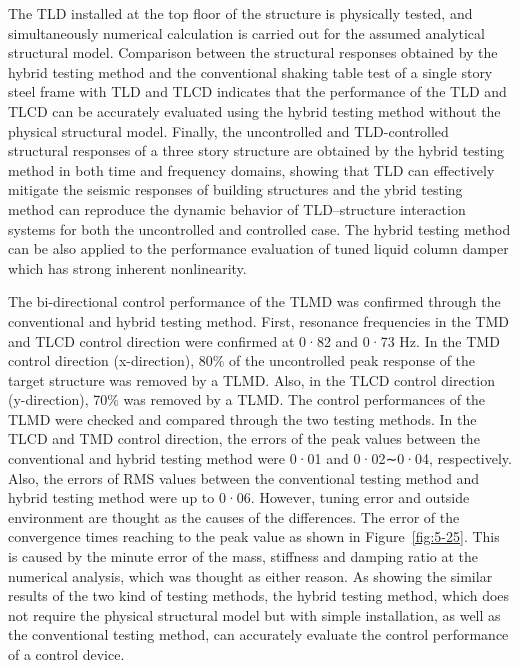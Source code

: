 The TLD installed at the top floor of the structure is physically tested, and simultaneously numerical calculation is carried out for the assumed analytical structural model. Comparison between the structural responses obtained by the hybrid testing method and the conventional shaking table test of a single story steel frame with TLD and TLCD indicates that the performance of the TLD and TLCD can be accurately evaluated using the hybrid testing method without the physical structural model. Finally, the uncontrolled and TLD-controlled structural responses of a three story structure are obtained by the hybrid testing method in both time and frequency domains, showing that TLD can effectively mitigate the seismic responses of building structures and the ybrid testing method can reproduce the dynamic behavior of TLD–structure interaction systems for both the uncontrolled and controlled case. The hybrid testing method can be also applied to the performance evaluation of tuned liquid column damper which has strong inherent nonlinearity.


The bi-directional control performance of the TLMD was confirmed through the conventional and hybrid testing method. First, resonance frequencies in the TMD and TLCD control direction were confirmed at 0·82 and 0·73 Hz. In the TMD control direction (x-direction), 80\% of the uncontrolled peak response of the target structure was removed by a TLMD. Also, in the TLCD control direction (y-direction), 70\% was removed by a TLMD. 
The control performances of the TLMD were checked and compared through the two testing methods. In the TLCD and TMD control direction, the errors of the peak values between the conventional and hybrid testing method were 0·01 and 0·02∼0·04, respectively. Also, the errors of RMS values between the conventional testing method and hybrid testing method were up to 0·06. However, tuning error and outside environment are thought as the causes of the differences. The error of the convergence times reaching to the peak value as shown in Figure~\ref{fig:5-25}. This is caused by the minute error of the mass, stiffness and damping ratio at the numerical analysis, which was thought as either reason. 
As showing the similar results of the two kind of testing methods, the hybrid testing method, which does not require the physical structural model but with simple installation, as well as the conventional testing method, can accurately evaluate the control performance of a control device.
